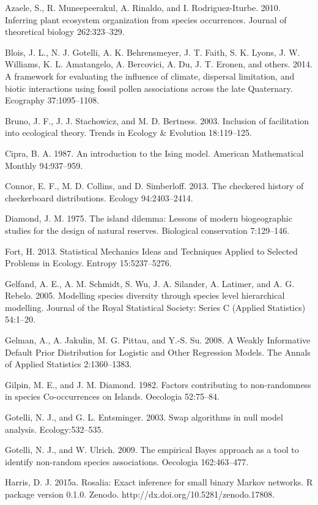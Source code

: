 \documentclass[12pt,]{article}
\begin{document}
\begin{spacing}{1.9}
\begin{flushleft}
Azaele, S., R. Muneepeerakul, A. Rinaldo, and I. Rodriguez-Iturbe. 2010.
Inferring plant ecosystem organization from species occurrences. Journal
of theoretical biology 262:323--329.

Blois, J. L., N. J. Gotelli, A. K. Behrensmeyer, J. T. Faith, S. K.
Lyons, J. W. Williams, K. L. Amatangelo, A. Bercovici, A. Du, J. T.
Eronen, and others. 2014. A framework for evaluating the influence of
climate, dispersal limitation, and biotic interactions using fossil
pollen associations across the late Quaternary. Ecography 37:1095--1108.

Bruno, J. F., J. J. Stachowicz, and M. D. Bertness. 2003. Inclusion of
facilitation into ecological theory. Trends in Ecology \& Evolution
18:119--125.

Cipra, B. A. 1987. An introduction to the Ising model. American
Mathematical Monthly 94:937--959.

Connor, E. F., M. D. Collins, and D. Simberloff. 2013. The checkered
history of checkerboard distributions. Ecology 94:2403--2414.

Diamond, J. M. 1975. The island dilemma: Lessons of modern biogeographic
studies for the design of natural reserves. Biological conservation
7:129--146.

Fort, H. 2013. Statistical Mechanics Ideas and Techniques Applied to
Selected Problems in Ecology. Entropy 15:5237--5276.

Gelfand, A. E., A. M. Schmidt, S. Wu, J. A. Silander, A. Latimer, and A.
G. Rebelo. 2005. Modelling species diversity through species level
hierarchical modelling. Journal of the Royal Statistical Society: Series
C (Applied Statistics) 54:1--20.

Gelman, A., A. Jakulin, M. G. Pittau, and Y.-S. Su. 2008. A Weakly
Informative Default Prior Distribution for Logistic and Other Regression
Models. The Annals of Applied Statistics 2:1360--1383.

Gilpin, M. E., and J. M. Diamond. 1982. Factors contributing to
non-randomness in species Co-occurrences on Islands. Oecologia
52:75--84.

Gotelli, N. J., and G. L. Entsminger. 2003. Swap algorithms in null
model analysis. Ecology:532--535.

Gotelli, N. J., and W. Ulrich. 2009. The empirical Bayes approach as a
tool to identify non-random species associations. Oecologia
162:463--477.

Harris, D. J. 2015a. Rosalia: Exact inference for small binary Markov
networks. R package version 0.1.0. Zenodo.
http://dx.doi.org/10.5281/zenodo.17808.


\end{flushleft}
\end{spacing}
\end{document}
